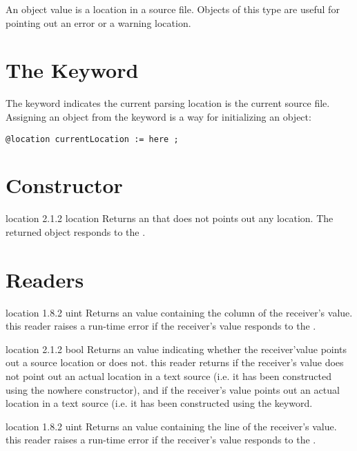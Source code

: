 

An  object value is a location in a source file. Objects of this type are useful for pointing out an error or a warning location.

\section{The  Keyword}

The  keyword indicates the current parsing location is the current source file. Assigning an  object from the  keyword is a way for initializing an  object:\newline

\texttt{@location currentLocation := here ;}

\section{Constructor}

{location}
{2.1.2}
{location}
{Returns an  that does not points out any location.}
{The returned object responds  to the .}

\section{Readers}

{location}
{1.8.2}
{uint}
{Returns an  value containing the column of the receiver's value.}
{this reader raises a run-time error if the receiver's value responds  to the .}


{location}
{2.1.2}
{bool}
{Returns an  value indicating whether the receiver'value points out a source location or does not.}
{this reader returns  if the receiver's value does not point out an actual location in a text source (i.e. it has been constructed using the nowhere constructor), and  if the receiver's value points out an actual location in a text source (i.e. it has been constructed using the  keyword.}


{location}
{1.8.2}
{uint}
{Returns an  value containing the line of the receiver's value.}
{this reader raises a run-time error if the receiver's value responds  to the .}


